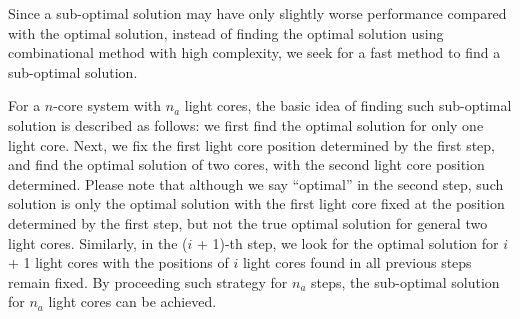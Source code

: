 Since a sub-optimal solution may have only slightly worse performance compared with the optimal solution, instead of finding the optimal solution using combinational method with high complexity, we seek for a fast method to find a sub-optimal solution.

For a $n$-core system with $n_{a}$ light cores, the basic idea of finding such sub-optimal solution is described as follows: we first find the optimal solution for only one light core. Next, we fix the first light core position determined by the first step, and find the optimal solution of two cores, with the second light core position determined. Please note that although we say “optimal” in the second step, such solution is only the optimal solution with the first light core fixed at the position determined by the first step, but not the true optimal solution for general two light cores. Similarly, in the ($i$ + 1)-th step, we look for the optimal solution for $i$ + 1 light cores with the positions of $i$ light cores found in all previous steps remain fixed. By proceeding such strategy for $n_{a}$ steps, the sub-optimal solution for $n_{a}$ light cores can be achieved.
